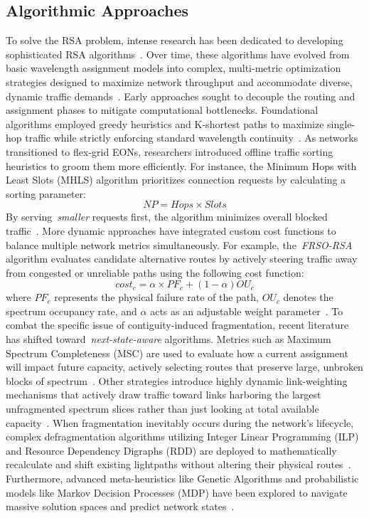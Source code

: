 \documentclass[12pt, a4paper, twoside, openright]{report}
\begin{document}
\subsection{Algorithmic Approaches}
To solve the RSA problem, intense research has been dedicated to developing sophisticated RSA algorithms~\cite{distanceAdaptive}. Over time, these algorithms have evolved from basic wavelength assignment models into complex, multi-metric optimization strategies designed to maximize network throughput and accommodate diverse, dynamic traffic demands~\cite{algorithmsRSATaxonomy}. Early approaches sought to decouple the routing and assignment phases to mitigate computational bottlenecks. Foundational algorithms employed greedy heuristics and K-shortest paths to maximize single-hop traffic while strictly enforcing standard wavelength continuity~\cite{heuristicWSAMultihop}. As networks transitioned to flex-grid EONs, researchers introduced offline traffic sorting heuristics to groom them more efficiently. For instance, the Minimum Hops with Least Slots (MHLS) algorithm prioritizes connection requests by calculating a sorting parameter:
\[
    NP=Hops \times Slots
\]
By serving~\emph{smaller} requests first, the algorithm minimizes overall blocked traffic~\cite{rsaHeuristicSliced}. More dynamic approaches have integrated custom cost functions to balance multiple network metrics simultaneously. For example, the~\emph{FRSO-RSA} algorithm evaluates candidate alternative routes by actively steering traffic away from congested or unreliable paths using the following cost function:
\[
    cost_c = \alpha \times PF_c + (1 - \alpha) OU_c
\]
where $PF_c$ represents the physical failure rate of the path, $OU_c$ denotes the spectrum occupancy rate, and $\alpha$ acts as an adjustable weight parameter~\cite{failureProbability}.
To combat the specific issue of contiguity-induced fragmentation, recent literature has shifted toward~\emph{next-state-aware} algorithms. Metrics such as Maximum Spectrum Completeness (MSC) are used to evaluate how a current assignment will impact future capacity, actively selecting routes that preserve large, unbroken blocks of spectrum~\cite{maximumSpectrumCompleteness}. Other strategies introduce highly dynamic link-weighting mechanisms that actively draw traffic toward links harboring the largest unfragmented spectrum slices rather than just looking at total available capacity~\cite{spectrumStatusAware}. When fragmentation inevitably occurs during the network's lifecycle, complex defragmentation algorithms utilizing Integer Linear Programming (ILP) and Resource Dependency Digraphs (RDD) are deployed to mathematically recalculate and shift existing lightpaths without altering their physical routes~\cite{optimizingSpectrumAllocationEON}. Furthermore, advanced meta-heuristics like Genetic Algorithms and probabilistic models like Markov Decision Processes (MDP) have been explored to navigate massive solution spaces and predict network states~\cite{routingModulation,adaptiveRSAFlex}.
\end{document}
